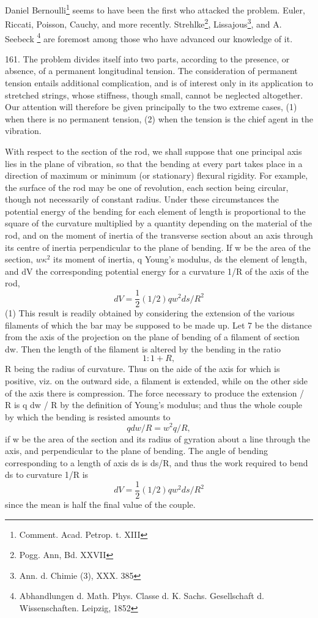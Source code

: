 Daniel Bernoulli\footnote{Comment. Acad. Petrop. t. XIII} seems to have
been the first who attacked the problem. Euler, Riccati, Poisson,
Cauchy, and more recently. Strehlke\footnote{Pogg. Ann, Bd. XXVII},
Lissajous\footnote{Ann. d. Chimie (3), XXX. 385}, and A. Seebeck
\footnote{Abhandlungen d. Math. Phys. Classe d. K. Sachs. Gesellschaft
d. Wissenschaften. Leipzig, 1852} are foremost among those who have
advanced our knowledge of it.

161. The problem divides itself into two parts, according to the
presence, or absence, of a permanent longitudinal tension. The
consideration of permanent tension entails additional complication, and
is of interest only in its application to stretched strings, whose
stiffness, though small, cannot be neglected altogether. Our attention
will therefore be given principally to the two extreme cases, (1) when
there is no permanent tension, (2) when the tension is the chief agent
in the vibration.

With respect to the section of the rod, we shall suppose that one
principal axis lies in the plane of vibration, so that the bending at
every part takes place in a direction of maximum or minimum
(or stationary) flexural rigidity. For example, the surface of the rod may
be one of revolution, each section being circular, though not
necessarily of constant radius. Under these circumstances the potential
energy of the bending for each element of length is proportional to the
square of the curvature multiplied by a quantity depending on the
material of the rod, and on the moment of inertia of the transverse
section about an axis through its centre of inertia perpendicular to the
plane of bending. If w be the area of the section, \(w \kappa^2\) its
moment of inertia, q Young's modulus, ds the element of length, and dV
the corresponding potential energy for a curvature 1/R of the axis of
the rod,
\[ dV=\frac{1}{2}(1/2) q w^{2} ds/R^2 \]
(1) This result is readily obtained by considering the extension of the
various filaments of which the bar may be supposed to be made up. Let 7
be the distance from the axis of the projection on the plane of bending
of a filament of section dw. Then the length of the filament is altered
by the bending in the ratio
\[ 1:1 + R, \]
R being the radius of curvature. Thus on the aide of the axis for which
is positive, viz. on the outward side, a filament is extended, while on
the other side of the axis there is compression. The force necessary to
produce the extension / R is q dw / R by the definition of Young's
modulus; and thus the whole couple by which the bending is resisted
amounts to
\[ q dw / R = w^{2}q/R, \]
if w be the area of the section and its radius of gyration about a line
through the axis, and perpendicular to the plane of bending. The angle
of bending corresponding to a length of axis ds is ds/R, and thus the
work required to bend ds to curvature 1/R is
\[ dV=\frac{1}{2}(1/2) q w^{2} ds/R^2 \]
since the mean is half the final value of the couple.


